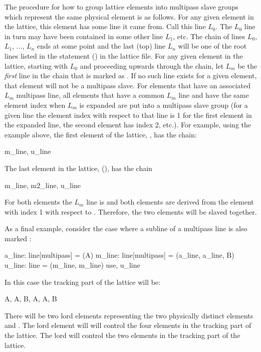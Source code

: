 The procedure for how to group lattice elements into multipass slave groups which represent the same
physical element is as follows. For any given element in the lattice, this element has some line it
came from. Call this line $L_0$. The $L_0$ line in turn may have been contained in some other line
$L_1$, etc. The chain of lines $L_0$, $L_1$, ..., $L_n$ ends at some point and the last (top) line
$L_n$ will be one of the root lines listed in the  statement () in the lattice
file. For any given element in the lattice, starting with $L_0$ and proceeding upwards through the
chain, let $L_m$ be the {\em first} line in the chain that is marked as . If no such
line exists for a given element, that element will not be a multipass slave. For elements that have
an associated $L_m$ multipass line, all elements that have a common $L_m$ line and have the same
element index when $L_m$ is expanded are put into a multipass slave group (for a given line the
element index with respect to that line is 1 for the first element in the expanded line, the second
element has index 2, etc.).  For example, using the example above, the first element of the lattice,
, has the chain:
\begin{example}
    m_line, u_line
\end{example} 
The last element in the lattice, (), has the chain
\begin{example}
  m_line, m2_line, u_line
\end{example}
For both elements the $L_m$ line is  and both elements are derived from the element with
index 1 with respect to . Therefore, the two elements will be slaved together.

As a final example, consider the case where a subline of a multipass line is also marked
:
\begin{example}
  a_line: line[multipass] = (A)
  m_line: line[multipass] = (a_line, a_line, B)
  u_line: line = (m_line, m_line)
  use, u_line
\end{example}
In this case the tracking part of the lattice will be:
\begin{example}
  A, A, B, A, A, B
\end{example}
There will be two lord elements representing the two physically distinct elements  and .
The  lord element will will control the four  elements in the tracking
part of the lattice. The  lord will control the two  elements in the tracking part
of the lattice. 

